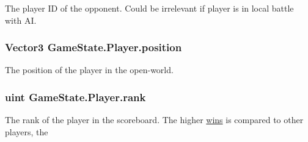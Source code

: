 The player I\-D of the opponent. Could be irrelevant if player is in local battle with A\-I. 

\hypertarget{class_game_state_1_1_player_a24a9ccd0325cae667f125821b3be79c2}{
\subsubsection[{position}]{\setlength{\rightskip}{0pt plus 5cm}Vector3 Game\-State.\-Player.\-position}}\label{class_game_state_1_1_player_a24a9ccd0325cae667f125821b3be79c2}


The position of the player in the open-\/world. 

\hypertarget{class_game_state_1_1_player_a6cf0778cc27a824eac211b8b29b3dfcc}{
\subsubsection[{rank}]{\setlength{\rightskip}{0pt plus 5cm}uint Game\-State.\-Player.\-rank}}\label{class_game_state_1_1_player_a6cf0778cc27a824eac211b8b29b3dfcc}


The rank of the player in the scoreboard. The higher \hyperlink{class_game_state_1_1_player_a3a4d13459cad9bd58e058ddc6387af70}{wins} is compared to other players, the 

